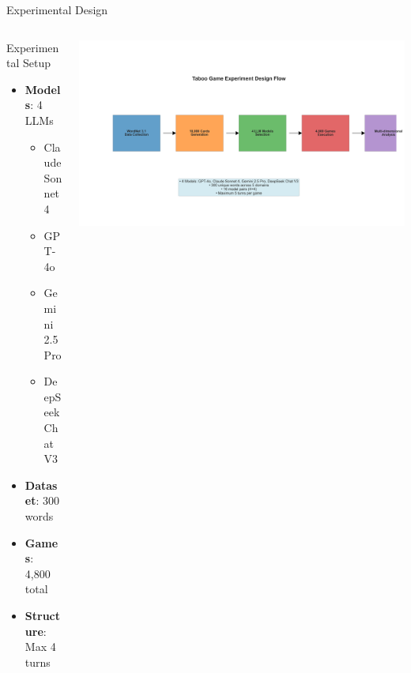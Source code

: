 \documentclass[aspectratio=169]{beamer}
\begin{document}
\begin{frame}{Experimental Design}
\begin{columns}[c]
\begin{column}{0.5\textwidth}
\begin{block}{Experimental Setup}
\begin{itemize}
    \item \textbf{Models}: 4 LLMs
    \begin{itemize}
        \item Claude Sonnet 4
        \item GPT-4o
        \item Gemini 2.5 Pro
        \item DeepSeek Chat V3
    \end{itemize}
    \item \textbf{Dataset}: 300 words
    \item \textbf{Games}: 4,800 total
    \item \textbf{Structure}: Max 4 turns
\end{itemize}
\end{block}
\end{column}

\begin{column}{0.48\textwidth}
\begin{center}
\includegraphics[width=\textwidth]{presentation_figures/figure1_flowchart.png}
\end{center}
\end{column}
\end{columns}
\end{frame}
\end{document}
